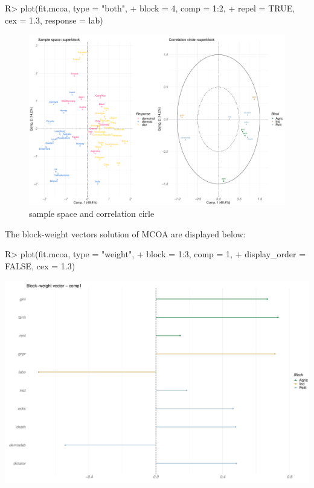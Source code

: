 \documentclass[
]{jss}
\begin{document}
\begin{CodeChunk}
\begin{CodeInput}
R> plot(fit.mcoa, type = "both",
+      block = 4, comp = 1:2, 
+      repel = TRUE, cex = 1.3, response = lab)
\end{CodeInput}
\begin{figure}

{\centering \includegraphics{RGCCA_files/figure-latex/unnamed-chunk-16-1} 

}

\caption[sample space and correlation cirle]{sample space and correlation cirle}\label{fig:unnamed-chunk-16}
\end{figure}
\end{CodeChunk}

\normalsize

The block-weight vectors solution of MCOA are displayed below:

\footnotesize

\begin{CodeChunk}
\begin{CodeInput}
R> plot(fit.mcoa, type = "weight",
+      block = 1:3, comp = 1,
+      display_order = FALSE, cex = 1.3)
\end{CodeInput}


\begin{center}\includegraphics{RGCCA_files/figure-latex/unnamed-chunk-17-1} \end{center}

\end{CodeChunk}
\end{document}
